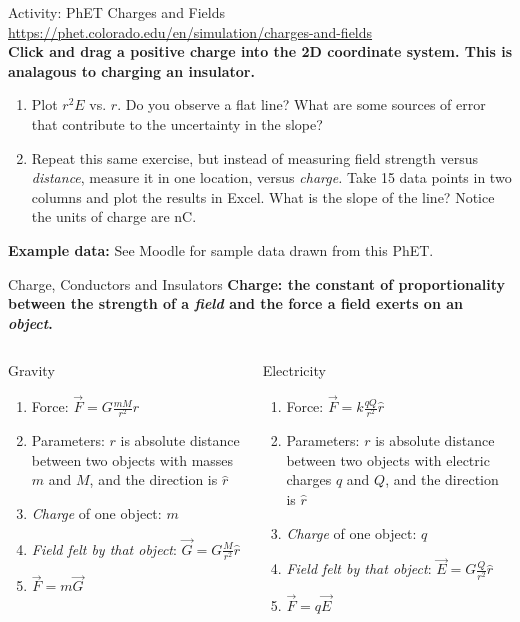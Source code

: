 \documentclass{beamer}
\begin{document}
\begin{frame}{Activity: PhET Charges and Fields}
\small
\url{https://phet.colorado.edu/en/simulation/charges-and-fields} \\ \vspace{0.2cm}
\textbf{Click and drag a positive charge into the 2D coordinate system.  This is analagous to charging an insulator.}
\begin{enumerate}
\item Plot $r^2 E$ vs. $r$.  Do you observe a flat line?  What are some sources of error that contribute to the uncertainty in the slope?
\item Repeat this same exercise, but instead of measuring field strength versus \textit{distance}, measure it in one location, versus \textit{charge.} Take 15 data points in two columns and plot the results in Excel.  What is the slope of the line?  Notice the units of charge are nC.
\end{enumerate}
\textbf{Example data:} See Moodle for sample data drawn from this PhET.
\end{frame}

\begin{frame}{Charge, Conductors and Insulators}
\centering
\textbf{\alert{Charge: the constant of proportionality between the strength of a \textit{field} and the force a field exerts on an \textit{object}.}} \\
\hrulefill
\small
\begin{columns}[T]
\begin{column}{0.5\textwidth}
\alert{Gravity}
\begin{enumerate}
\item Force: $\vec{F} = G \frac{m M}{r^2} \hat{r}$
\item Parameters: $r$ is absolute distance between two objects with masses $m$ and $M$, and the direction is $\hat{r}$
\item \textit{Charge} of one object: $m$
\item \textit{Field felt by that object}: $\vec{G} = G \frac{M}{r^2} \hat{r}$
\item $\vec{F} = m \vec{G}$
\end{enumerate}
\end{column}
\begin{column}{0.5\textwidth}
\alert{Electricity}
\begin{enumerate}
\item Force: $\vec{F} = k \frac{q Q}{r^2} \hat{r}$
\item Parameters: $r$ is absolute distance between two objects with electric charges $q$ and $Q$, and the direction is $\hat{r}$
\item \textit{Charge} of one object: $q$
\item \textit{Field felt by that object}: $\vec{E} = G \frac{Q}{r^2} \hat{r}$
\item $\vec{F} = q \vec{E}$
\end{enumerate}
\end{column}
\end{columns}
\end{frame}
\end{document}
